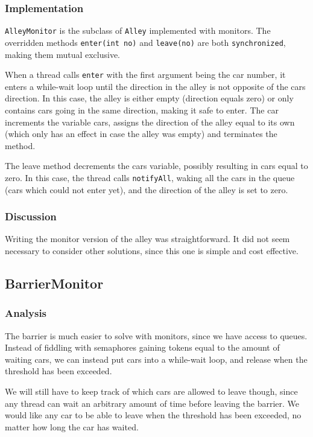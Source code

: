 \subsubsection{Implementation}
\texttt{AlleyMonitor} is the subclass of \texttt{Alley} implemented with monitors. The overridden methods \texttt{enter(int no)} and \texttt{leave(no)} are both \texttt{synchronized}, making them mutual exclusive.

When a thread calls \texttt{enter} with the first argument being the car number, it enters a while-wait loop until the direction in the alley is not opposite of the cars direction. In this case, the alley is either empty (direction equals zero) or only contains cars going in the same direction, making it safe to enter. The car increments the variable cars, assigns the direction of the alley equal to its own (which only has an effect in case the alley was empty) and terminates the method.

The leave method decrements the cars variable, possibly resulting in cars equal to zero. In this case, the thread calls \texttt{notifyAll}, waking all the cars in the queue (cars which could not enter yet), and the direction of the alley is set to zero.

\subsubsection{Discussion}
Writing the monitor version of the alley was straightforward. It did not seem necessary to consider other solutions, since this one is simple and cost effective.

\subsection{BarrierMonitor}
\subsubsection{Analysis}
The barrier is much easier to solve with monitors, since we have access to queues. Instead of fiddling with semaphores gaining tokens equal to the amount of waiting cars, we can instead put cars into a while-wait loop, and release when the threshold has been exceeded.

We will still have to keep track of which cars are allowed to leave though, since any thread can wait an arbitrary amount of time before leaving the barrier. We would like any car to be able to leave when the threshold has been exceeded, no matter how long the car has waited.

